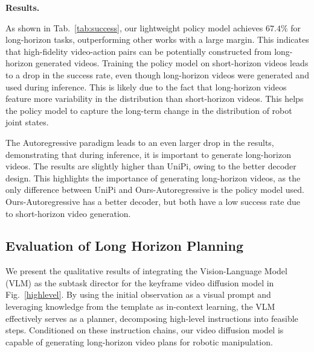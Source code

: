 \documentclass[letterpaper, 10 pt, conference]{ieeeconf}  %
\begin{document}

\noindent\textbf{Results.} 

 As shown in Tab.~\ref{tab:success}, our lightweight policy model achieves $67.4\%$ for long-horizon tasks, outperforming other works with a large margin. This indicates that high-fidelity video-action pairs can be potentially constructed from long-horizon generated videos. 
 Training the policy model on short-horizon videos leads to a drop in the success rate, even though long-horizon videos were generated and used during inference. This is likely due to the fact that long-horizon videos feature more variability in the distribution than short-horizon videos. This helps the policy model to capture the long-term change in the distribution of robot joint states.

 The Autoregressive paradigm leads to an even larger drop in the results, demonstrating that during inference, it is important to generate long-horizon videos. The results are slightly higher than UniPi, owing to the better decoder design. This highlights the importance of generating long-horizon videos, as the only difference between UniPi and Ours-Autoregressive is the policy model used. Ours-Autoregressive has a better decoder, but both have a low success rate due to short-horizon video generation.
 

 

\subsection{Evaluation of Long Horizon Planning}
\label{sec:plan}

We present the qualitative results of integrating the Vision-Language Model (VLM) as the subtask director for the keyframe video diffusion model in Fig.~\ref{highlevel}. By using the initial observation as a visual prompt and leveraging knowledge from the template as in-context learning, the VLM effectively serves as a planner, decomposing high-level instructions into feasible steps. Conditioned on these instruction chains, our video diffusion model is capable of generating long-horizon video plans for robotic manipulation.
\end{document}
